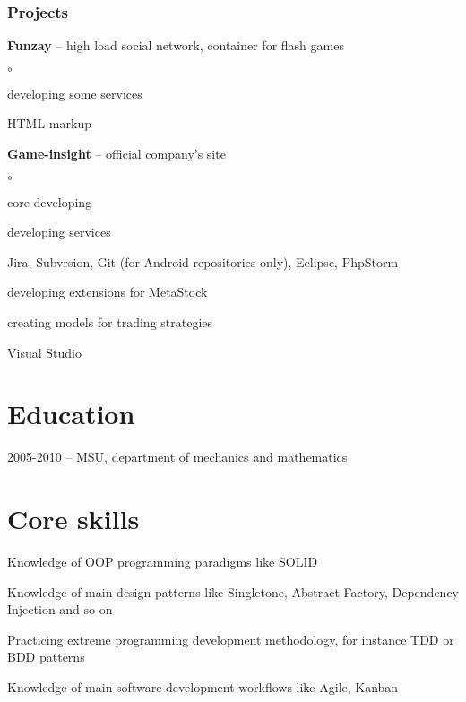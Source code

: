 \documentclass{cv}
\begin{document}
    \subsubsection* {Projects}
      \begin{bulist}
        \item \textbf{Funzay} -- high load social network, container for flash
          games
          \begin{list}{$\circ$}{}
            \item developing some services
            \item HTML markup 
          \end{list} 
        \item \textbf{Game-insight} -- official company's site
          \begin{list}{$\circ$}{}
            \item core developing
            \item developing services
          \end{list}
      \end{bulist}
    \devtools
      Jira, Subvrsion, Git (for Android repositories only), Eclipse, PhpStorm

    \begin{gaas}
      \item developing extensions for MetaStock
      \item creating models for trading strategies
    \end{gaas}
    \devtools
      Visual Studio


\section* {Education}
2005-2010 -- MSU, department of mechanics and mathematics


\section* {Core skills}
  \begin{bulist}
    \item Knowledge of OOP programming paradigms like SOLID
    \item Knowledge of main design patterns like Singletone, Abstract Factory,
      Dependency Injection and so on
    \item Practicing extreme programming development methodology, for instance
      TDD or BDD patterns 
    \item Knowledge of main software development workflows like Agile, Kanban
  \end{bulist}
\end{document}
